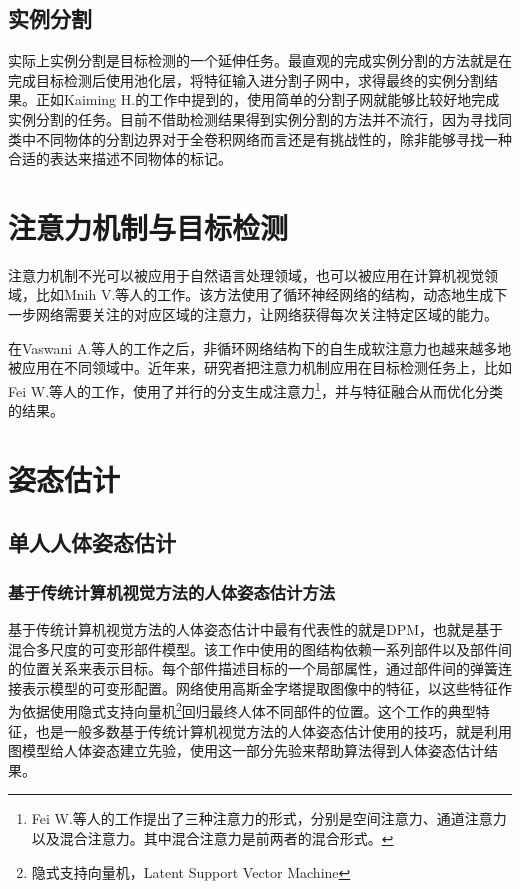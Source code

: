 \subsection{实例分割}
\label{subsec:insseg}
实际上实例分割是目标检测的一个延伸任务。最直观的完成实例分割的方法就是在完成目标检测后使用池化层，将特征输入进分割子网中，求得最终的实例分割结果。正如Kaiming H.\cite{He2017Mask}的工作中提到的，使用简单的分割子网就能够比较好地完成实例分割的任务。目前不借助检测结果得到实例分割的方法并不流行，因为寻找同类中不同物体的分割边界对于全卷积网络而言还是有挑战性的，除非能够寻找一种合适的表达来描述不同物体的标记。

\section{注意力机制与目标检测}
\label{sec:attenandobjdet}
注意力机制不光可以被应用于自然语言处理领域，也可以被应用在计算机视觉领域，比如Mnih V.等人的工作\cite{mnih2014recurrent}。该方法使用了循环神经网络的结构，动态地生成下一步网络需要关注的对应区域的注意力，让网络获得每次关注特定区域的能力。

在Vaswani A.等人的工作\cite{vaswani2017attention}之后，非循环网络结构下的自生成软注意力也越来越多地被应用在不同领域中。近年来，研究者把注意力机制应用在目标检测任务上，比如Fei W.等人的工作\cite{wang2017residual}，使用了并行的分支生成注意力\footnote{Fei W.等人的工作提出了三种注意力的形式，分别是空间注意力、通道注意力以及混合注意力。其中混合注意力是前两者的混合形式。}，并与特征融合从而优化分类的结果。

\section{姿态估计}
\subsection{单人人体姿态估计}
\label{subsec:singlepose}
\subsubsection{基于传统计算机视觉方法的人体姿态估计方法}
\label{subsubsec:legacypose}
基于传统计算机视觉方法的人体姿态估计中最有代表性的就是DPM\cite{felzenszwalb2010object}，也就是基于混合多尺度的可变形部件模型。该工作中使用的图结构依赖一系列部件以及部件间的位置关系来表示目标。每个部件描述目标的一个局部属性，通过部件间的弹簧连接表示模型的可变形配置。网络使用高斯金字塔提取图像中的特征，以这些特征作为依据使用隐式支持向量机\footnote{隐式支持向量机，Latent Support Vector Machine}回归最终人体不同部件的位置。这个工作的典型特征，也是一般多数基于传统计算机视觉方法的人体姿态估计使用的技巧，就是利用图模型给人体姿态建立先验，使用这一部分先验来帮助算法得到人体姿态估计结果。
